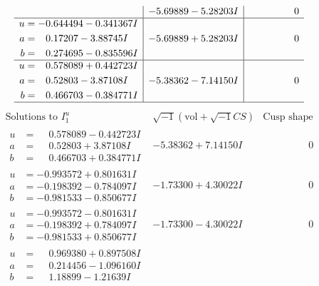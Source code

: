\documentclass[1p]{elsarticle_modified}
\theoremstyle{definition}
\newcommand{\I}{\sqrt{-1}}
\begin{document}
$$\begin{array}{c|c|c}
 & -5.69889 - 5.28203 I & \phantom{-0.000000 } 0 \\ \hline\begin{aligned}
u &= -0.644494 - 0.341367 I \\
a &= \phantom{-}0.17207 - 3.88745 I \\
b &= \phantom{-}0.274695 - 0.835596 I\end{aligned}
 & -5.69889 + 5.28203 I & \phantom{-0.000000 } 0 \\ \hline\begin{aligned}
u &= \phantom{-}0.578089 + 0.442723 I \\
a &= \phantom{-}0.52803 - 3.87108 I \\
b &= \phantom{-}0.466703 - 0.384771 I\end{aligned}
 & -5.38362 - 7.14150 I & \phantom{-0.000000 } 0\\
 \hline 
 \end{array}$$\newpage$$\begin{array}{c|c|c}  
\text{Solutions to }I^u_{1}& \I (\text{vol} + \sqrt{-1}CS) & \text{Cusp shape}\\
 \hline 
\begin{aligned}
u &= \phantom{-}0.578089 - 0.442723 I \\
a &= \phantom{-}0.52803 + 3.87108 I \\
b &= \phantom{-}0.466703 + 0.384771 I\end{aligned}
 & -5.38362 + 7.14150 I & \phantom{-0.000000 } 0 \\ \hline\begin{aligned}
u &= -0.993572 + 0.801631 I \\
a &= -0.198392 - 0.784097 I \\
b &= -0.981533 - 0.850677 I\end{aligned}
 & -1.73300 + 4.30022 I & \phantom{-0.000000 } 0 \\ \hline\begin{aligned}
u &= -0.993572 - 0.801631 I \\
a &= -0.198392 + 0.784097 I \\
b &= -0.981533 + 0.850677 I\end{aligned}
 & -1.73300 - 4.30022 I & \phantom{-0.000000 } 0 \\ \hline\begin{aligned}
u &= \phantom{-}0.969380 + 0.897508 I \\
a &= \phantom{-}0.214456 - 1.096160 I \\
b &= \phantom{-}1.18899 - 1.21639 I\end{aligned}

\end{array}$$
\end{document}
